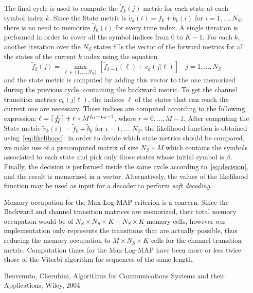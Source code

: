 \documentclass[10pt]{article}
\DeclarePairedDelimiter{\ceil}{\lceil}{\rceil}
\begin{document}
The final cycle is used to compute the $\tilde{f}_k(j)$ metric for each state at each symbol index $k$. Since the State metric is $\tilde{v}_k(i) = \tilde{f}_k + \tilde{b}_k(i)$ for $i = 1, \dots, N_S$, there is no need to memorize $\tilde{f}_k(i)$ for every time index. A single iteration is performed in order to cover all the symbol indices from $0$ to $K-1$. For each $k$, another iteration over the $N_S$ states fills the vector of the forward metrics for all the states of the current $k$ index using the equation
\begin{equation}
	\tilde{f}_k(j) = \max_{\ell \in [1, \dots, N_S]} [\tilde{f}_{k-1}(\ell) + c_k(j|\ell)] \quad j = 1, \dots, N_S
\end{equation}
and the state metric is computed by adding this vector to the one memorized during the previous cycle, containing the backward metric. To get the channel transition metrics $c_k(j|\ell)$, the indices $\ell$ of the states that can reach the current one are necessary. These indices are computed according to the following expression: $\ell = \ceil{\frac{j}{M}} + r*M^{L_1+L_2-1}$, where $r = 0, \dots, M-1$. 
After computing the State metric $\tilde{v}_k(i) = \tilde{f}_k + \tilde{b}_k$ for $i = 1, \dots, N_S$, the likelihood function is obtained using~\eqref{eq:likelihood}: in order to decide which state metrics should be compared, we make use of a precomputed matrix of size $N_S \times M$ which contains the symbols associated to each state and pick only those states whose initial symbol is $\beta$. Finally, the decision is performed inside the same cycle according to~\eqref{eq:decision}, and the result is memorized in a vector. Alternatively, the values of the likelihood function may be used as input for  a decoder to perform \emph{soft decoding}.

Memory occupation for the Max-Log-MAP criterion is a concern. Since the Backward and channel transition matrices are memorized, their total memory occupation would be of $N_S \times N_S \times K + N_S \times K$ memory cells, however our implementation only represents the transitions that are actually possible, thus reducing the memory occupation to $M \times N_S \times K$ cells for the channel transition metric. Computation times for the Max-Log-MAP have been more or less twice those of the Viterbi algorithm for sequences of the same length.




\begin{thebibliography}{10}

Benvenuto, Cherubini, Algorithms for Communications Systems and their Applications, Wiley, 2004

\end{thebibliography}
\end{document}

